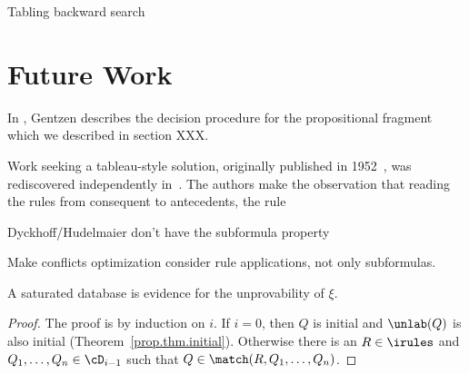 Tabling backward search

\section{Future Work}\label{prop.sec.future}

In \cite{Gentzen.1934.MZ}, Gentzen describes the decision procedure
for the propositional fragment which we described in section XXX.

Work seeking a tableau-style solution, originally published in
1952~\cite{Vorobev.1952.Doklady}, was rediscovered independently
in~\cite{Dyckhoff.1992.JSL}.  The authors make the observation that
reading the rules from consequent to antecedents, the rule

Dyckhoff/Hudelmaier don't have the subformula property

Make conflicts optimization consider rule applications, not
only subformulas.

\cite{Hudelmaier.1993.JLC}
\cite{Hudelmaier.1993.JLC}
\cite{Voronkov.1999.CADE}

\cite{Shankar.1992.CADE}


A saturated database is
evidence for the unprovability of $\xi$.

\begin{proof}
  The proof is by induction on $i$.  If $i=0$, then $Q$ is initial
  and $\unlab(Q)$ is also initial (Theorem~\ref{prop.thm.initial}).
  Otherwise there is an $R\in\irules$ and $Q_1, \ldots, Q_n\in\cD_{i-1}$
  such that $Q\in\match(R, Q_1,\ldots,Q_n)$.
\end{proof}
